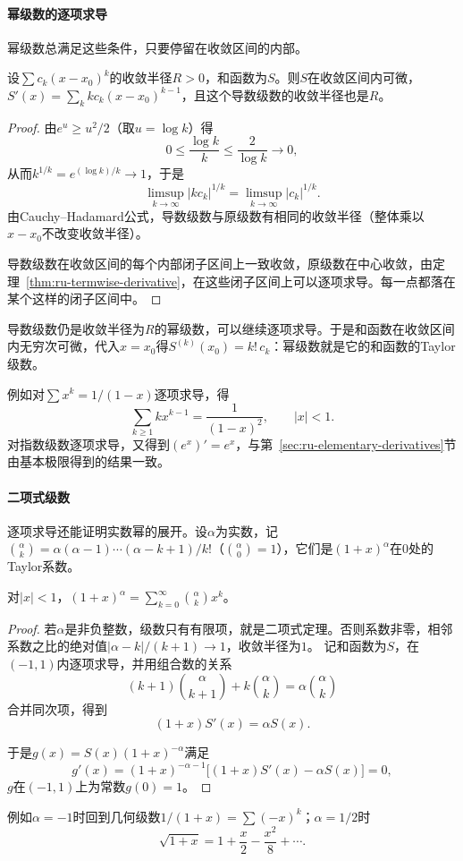\paragraph{幂级数的逐项求导}
幂级数总满足这些条件，只要停留在收敛区间的内部。
\begin{theorem}[幂级数的逐项求导]
\label{thm:ru-power-series-derivative}
设$\sum c_k(x-x_0)^k$的收敛半径$R>0$，和函数为$S$。则$S$在收敛区间内可微，$S'(x)=\sum_kkc_k(x-x_0)^{k-1}$，且这个导数级数的收敛半径也是$R$。
\end{theorem}
\begin{proof}
由$e^u\geq u^2/2$（取$u=\log k$）得
\[
 0\leq\frac{\log k}k\leq\frac2{\log k}\to0,
\]
从而$k^{1/k}=e^{(\log k)/k}\to1$，于是
\[
 \limsup_{k\to\infty}|kc_k|^{1/k}=\limsup_{k\to\infty}|c_k|^{1/k}.
\]
由Cauchy--Hadamard公式，导数级数与原级数有相同的收敛半径（整体乘以$x-x_0$不改变收敛半径）。

导数级数在收敛区间的每个内部闭子区间上一致收敛，原级数在中心收敛，由定理~\ref{thm:ru-termwise-derivative}，在这些闭子区间上可以逐项求导。每一点都落在某个这样的闭子区间中。
\end{proof}
导数级数仍是收敛半径为$R$的幂级数，可以继续逐项求导。于是和函数在收敛区间内无穷次可微，代入$x=x_0$得$S^{(k)}(x_0)=k!\,c_k$：幂级数就是它的和函数的Taylor级数。

例如对$\sum x^k=1/(1-x)$逐项求导，得
\[
 \sum_{k\geq1}kx^{k-1}=\frac1{(1-x)^2},\qquad|x|<1.
\]
对指数级数逐项求导，又得到$(e^x)'=e^x$，与第~\ref{sec:ru-elementary-derivatives}节由基本极限得到的结果一致。

\paragraph{二项式级数}
逐项求导还能证明实数幂的展开。设$\alpha$为实数，记$\binom\alpha k=\alpha(\alpha-1)\cdots(\alpha-k+1)/k!$（$\binom\alpha0=1$），它们是$(1+x)^\alpha$在$0$处的Taylor系数。
\begin{theorem}[二项式级数]
\label{thm:ru-binomial-series}
对$|x|<1$，$(1+x)^\alpha=\sum_{k=0}^\infty\binom\alpha kx^k$。
\end{theorem}
\begin{proof}
若$\alpha$是非负整数，级数只有有限项，就是二项式定理。否则系数非零，相邻系数之比的绝对值$|\alpha-k|/(k+1)\to1$，收敛半径为$1$。
记和函数为$S$，在$(-1,1)$内逐项求导，并用组合数的关系
\[
 (k+1)\binom\alpha{k+1}+k\binom\alpha k=\alpha\binom\alpha k
\]
合并同次项，得到
\[
 (1+x)S'(x)=\alpha S(x).
\]

于是$g(x)=S(x)(1+x)^{-\alpha}$满足
\[
 g'(x)=(1+x)^{-\alpha-1}\bigl[(1+x)S'(x)-\alpha S(x)\bigr]=0,
\]
$g$在$(-1,1)$上为常数$g(0)=1$。
\end{proof}
例如$\alpha=-1$时回到几何级数$1/(1+x)=\sum(-x)^k$；$\alpha=1/2$时
\[
 \sqrt{1+x}=1+\frac x2-\frac{x^2}8+\cdots.
\]

